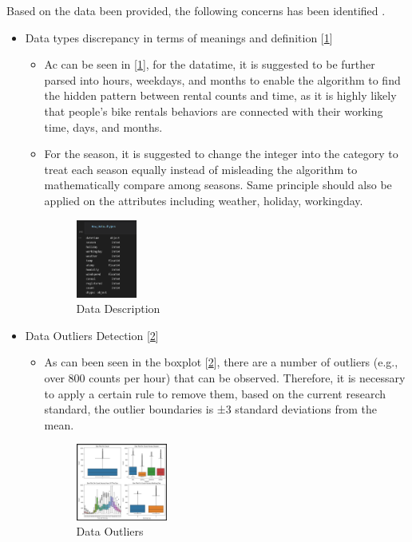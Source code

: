 Based on the data been provided, the following concerns has been identified . 

\begin{itemize}
  \item Data types discrepancy in terms of meanings and definition [\ref{fig:diagram}]
  \begin{itemize}
    \item Ac can be seen in [\ref{fig:diagram}], for the datatime, it is suggested to be further parsed into hours, weekdays, and months to enable the algorithm to find the hidden pattern between rental counts and time, as it is highly likely that people's bike rentals behaviors are connected with their working time, days, and months.
    \item For the season, it is suggested to change the integer into the category to treat each season equally instead of misleading the algorithm to mathematically compare among seasons. Same principle should also be applied on the attributes including weather, holiday, workingday.
        \begin{figure}[!ht]
        	\centering
        	\setlength{\abovecaptionskip}{0.cm}
        	\setlength{\belowcaptionskip}{-0.cm}
        	\includegraphics[width=0.2\textwidth]{./figures/DataType.png}
        	\caption{Data Description}
        	\label{fig:diagram}
        \end{figure}
  \end{itemize}
 
  \item Data Outliers Detection [\ref{fig:outliers}]
  \begin{itemize}
    \item As can been seen in the boxplot [\ref{fig:outliers}], there are a number of outliers (e.g., over 800 counts per hour) that can be observed. Therefore, it is necessary to apply a certain rule to remove them, based on the current research standard, the outlier boundaries is ±3 standard deviations from the mean.
         \begin{figure}[!ht]
        	\centering
        	\setlength{\abovecaptionskip}{0.cm}
        	\setlength{\belowcaptionskip}{-0.cm}
        	\includegraphics[width=0.3\textwidth]{./figures/DataOutliers.png}
        	\caption{Data Outliers}
        	\label{fig:outliers}
        \end{figure}
  \end{itemize}
 

\end{itemize}
